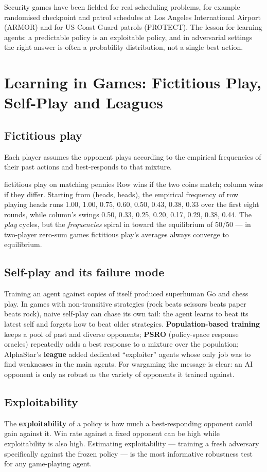 \documentclass[11pt]{article}
\begin{document}
Security games have been fielded for real scheduling problems, for example randomised checkpoint and patrol schedules at Los Angeles International Airport (ARMOR) and for US Coast Guard patrols (PROTECT). The lesson for learning agents: a predictable policy is an exploitable policy, and in adversarial settings the right answer is often a probability distribution, not a single best action.

\section{Learning in Games: Fictitious Play, Self-Play and Leagues}
\subsection{Fictitious play}
Each player assumes the opponent plays according to the empirical frequencies of their past actions and best-responds to that mixture.
\begin{example}{fictitious play on matching pennies}
Row wins if the two coins match; column wins if they differ. Starting from (heads, heads), the empirical frequency of row playing heads runs 1.00, 1.00, 0.75, 0.60, 0.50, 0.43, 0.38, 0.33 over the first eight rounds, while column's swings 0.50, 0.33, 0.25, 0.20, 0.17, 0.29, 0.38, 0.44. The \emph{play} cycles, but the \emph{frequencies} spiral in toward the equilibrium of 50/50 --- in two-player zero-sum games fictitious play's averages always converge to equilibrium.
\end{example}
\subsection{Self-play and its failure mode}
Training an agent against copies of itself produced superhuman Go and chess play. In games with non-transitive strategies (rock beats scissors beats paper beats rock), naive self-play can chase its own tail: the agent learns to beat its latest self and forgets how to beat older strategies. \textbf{Population-based training} keeps a pool of past and diverse opponents; \textbf{PSRO} (policy-space response oracles) repeatedly adds a best response to a mixture over the population; AlphaStar's \textbf{league} added dedicated ``exploiter'' agents whose only job was to find weaknesses in the main agents. For wargaming the message is clear: an AI opponent is only as robust as the variety of opponents it trained against.
\subsection{Exploitability}
The \textbf{exploitability} of a policy is how much a best-responding opponent could gain against it. Win rate against a fixed opponent can be high while exploitability is also high. Estimating exploitability --- training a fresh adversary specifically against the frozen policy --- is the most informative robustness test for any game-playing agent.
\end{document}
